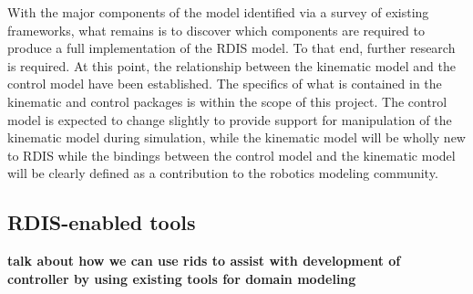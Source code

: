 With the major components of the model identified via a survey of existing frameworks, what remains is to discover which components are required to produce a full implementation of the RDIS model. To that end, further research is required. At this point, the relationship between the kinematic model and the control model have been established. The specifics of what is contained in the kinematic and control packages is within the scope of this project. The control model is expected to change slightly to provide support for manipulation of the kinematic model during simulation, while the kinematic model will be wholly new to RDIS while the bindings between the control model and the kinematic model will be clearly defined as a contribution to the robotics modeling community.

\subsection{RDIS-enabled tools}
{\bf talk about how we can use rids to assist with development of controller by using existing tools for domain modeling}
